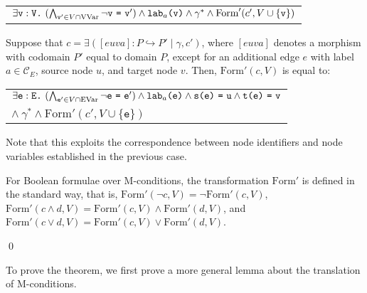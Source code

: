 \documentclass{llncs}
\newcommand{\mt}[1]{\text{\tt{#1}}}
\begin{document}
\begin{theorem}
		\begin{center}
		\begin{tabular}{l}
			\vspace{5pt}$\exists\mathtt{v}:\mathtt{V}\mt{.}\ (\bigwedge_{\mathtt{v}'\in V\cap \text{VVar}} \neg\mathtt{v}\ \mt{=}\ \mathtt{v}') \wedge \mathtt{lab}_a\mt{(}\mathtt{v}\mt{)} \wedge \gamma^* \wedge \text{Form}'(c',V\cup \{\mathtt{v}\})$
		\end{tabular}
		\end{center}

		Suppose that $c = \exists([euva]\!:P\hookrightarrow P'\mid \gamma, c')$, where $[euva]$ denotes a morphism with codomain $P'$ equal to domain $P$, except for an additional edge $e$ with label $a\in\mathcal{C}_E$, source node $u$, and target node $v$. Then, $\text{Form}'(c,V)$ is equal to:

		\begin{center}
		\begin{tabular}{l}
			\vspace{5pt}$\exists\mathtt{e}:\mathtt{E}\mt{.}\ (\bigwedge_{\mathtt{e}'\in V\cap \text{EVar}} \neg\mathtt{e}\ \mt{=}\ \mathtt{e}') \wedge \mathtt{lab}_a\mt{(}\mathtt{e}\mt{)} \wedge \mathtt{s}\mt{(}\mathtt{e}\mt{)}\ \mt{=}\ \mathtt{u} \wedge \mathtt{t}\mt{(}\mathtt{e}\mt{)}\ \mt{=}\ \mathtt{v}$\\
			
			\vspace{5pt}\hspace{0.5in}$\wedge\ \gamma^* \wedge \text{Form}'(c',V\cup \{\mathtt{e}\})$
		\end{tabular}
		\end{center}


	\noindent Note that this exploits the correspondence between node identifiers and node variables established in the previous case.

	For Boolean formulae over M-conditions, the transformation $\text{Form}'$ is defined in the standard way, that is, $\text{Form}'(\neg c,V) = \neg \text{Form}'(c,V)$, $\text{Form}'(c \wedge d,V) = \text{Form}'(c,V) \wedge \text{Form}'(d,V)$, and $\text{Form}'(c \vee d,V) = \text{Form}'(c,V) \vee \text{Form}'(d,V)$.

	\qed
	\end{theorem}
	
	To prove the theorem, we first prove a more general lemma about the translation of M-conditions.
	
\end{document}
